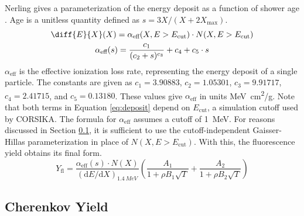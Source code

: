Nerling gives a parameterization of the energy deposit as a function of shower age \cite{nerling2006electron}. Age is a unitless quantity defined as $s = 3X / (X + 2X_\text{max})$.
\begin{gather} \label{eq:deposit}
    \diff{E}{X}(X) = \alpha_\text{eff}(X, E > E_\text{cut}) \cdot N(X, E > E_\text{cut}) \\
    \alpha_\text{eff}(s) = \frac{c_1}{(c_2 + s)^{c_3}} + c_4 + c_5 \cdot s
\end{gather}
$\alpha_\text{eff}$ is the effective ionization loss rate, representing the energy deposit of a single particle. The constants are given as $c_1 = \num{3.90883}$, $c_2 = \num{1.05301}$, $c_3 = \num{9.91717}$, $c_4 = \num{2.41715}$, and $c_5 = \num{0.13180}$. These values give $\alpha_\text{eff}$ in units \si{MeV.cm^2/g}. Note that both terms in Equation \ref{eq:deposit} depend on $E_\text{cut}$, a simulation cutoff used by CORSIKA. The formula for $\alpha_\text{eff}$ assumes a cutoff of \SI{1}{MeV}. For reasons discussed in Section \ref{sec:cherenkov}, it is sufficient to use the cutoff-independent Gaisser-Hillas parameterization in place of $N(X, E > E_\text{cut})$. With this, the fluorescence yield obtains its final form.
\begin{equation} \label{eq:fluor}
    Y_\text{fl} = \frac{\alpha_\text{eff}(s) \cdot N(X)}{(\text{d}E / \text{d}X)_{\SI{1.4}{MeV}}} 
        \left(\frac{A_1}{1 + \rho B_1 \sqrt{T}} + \frac{A_2}{1 + \rho B_2 \sqrt{T}}\right)
\end{equation}

\subsection{Cherenkov Yield} \label{sec:cherenkov}

